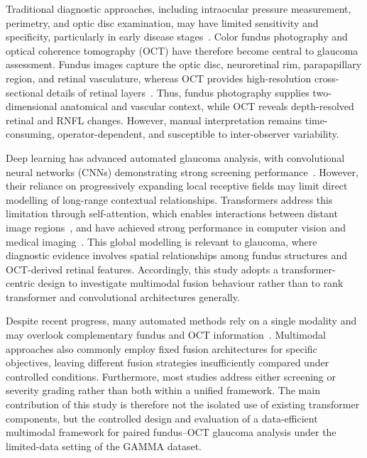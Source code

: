 \documentclass[sn-mathphys]{sn-jnl}%
\theoremstyle{thmstyleone}%
\theoremstyle{thmstyletwo}%
\theoremstyle{thmstylethree}%
\begin{document}
Traditional diagnostic approaches, including intraocular pressure measurement, perimetry, and optic disc examination, may have limited sensitivity and specificity, particularly in early disease stages~\cite{Shan2024,jayaram2023glaucoma}. Color fundus photography and optical coherence tomography (OCT) have therefore become central to glaucoma assessment. Fundus images capture the optic disc, neuroretinal rim, parapapillary region, and retinal vasculature, whereas OCT provides high-resolution cross-sectional details of retinal layers~\cite{kanski10}. Thus, fundus photography supplies two-dimensional anatomical and vascular context, while OCT reveals depth-resolved retinal and RNFL changes. However, manual interpretation remains time-consuming, operator-dependent, and susceptible to inter-observer variability.

Deep learning has advanced automated glaucoma analysis, with convolutional neural networks (CNNs) demonstrating strong screening performance~\cite{cho2021deep,shyamalee2022attention}. However, their reliance on progressively expanding local receptive fields may limit direct modelling of long-range contextual relationships. Transformers address this limitation through self-attention, which enables interactions between distant image regions~\cite{henry2022vision}, and have achieved strong performance in computer vision and medical imaging~\cite{fan2023detecting}. This global modelling is relevant to glaucoma, where diagnostic evidence involves spatial relationships among fundus structures and OCT-derived retinal features. Accordingly, this study adopts a transformer-centric design to investigate multimodal fusion behaviour rather than to rank transformer and convolutional architectures generally.

Despite recent progress, many automated methods rely on a single modality and may overlook complementary fundus and OCT information~\cite{dai2021transmed,meedeniya2025glaucoma}. Multimodal approaches also commonly employ fixed fusion architectures for specific objectives, leaving different fusion strategies insufficiently compared under controlled conditions. Furthermore, most studies address either screening or severity grading rather than both within a unified framework. The main contribution of this study is therefore not the isolated use of existing transformer components, but the controlled design and evaluation of a data-efficient multimodal framework for paired fundus--OCT glaucoma analysis under the limited-data setting of the GAMMA dataset.
\end{document}

